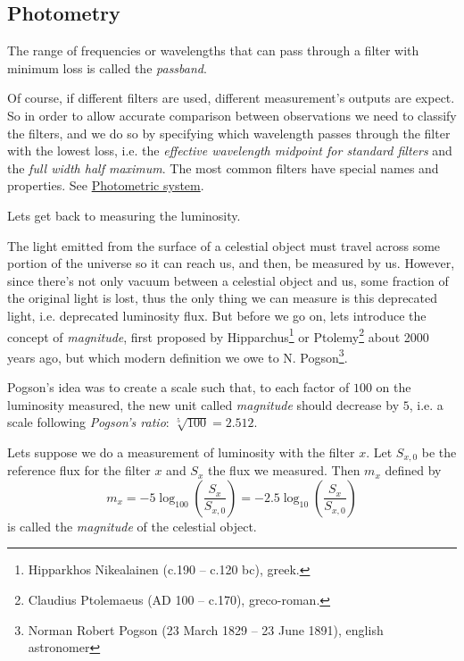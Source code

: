 \documentclass{_mypackages/monograph}
\begin{document}
\subsection{Photometry}

\begin{definition}
The range of frequencies or wavelengths that can pass through a filter with minimum loss is called the \emph{passband}. 
\end{definition}

Of course, if different filters are used, different measurement's outputs are expect. So in order to allow accurate comparison between observations we need to classify the filters, and we do so by specifying which wavelength passes through the filter with the lowest loss, i.e. the \emph{effective wavelength midpoint for standard filters} and the \emph{full width half maximum}. The most common filters have special names and properties. See \href{https://en.wikipedia.org/wiki/Photometric_system#Filters_used}{Photometric system}.

Lets get back to measuring the luminosity.

The light emitted from the surface of a celestial object must travel across some portion of the universe so it can reach us, and then, be measured by us. However, since there's not only vacuum between a celestial object and us, some fraction of the original light is lost, thus the only thing we can measure is this deprecated light, i.e. deprecated luminosity flux. But before we go on, lets introduce the concept of \emph{magnitude}, first proposed by Hipparchus\footnote{Hipparkhos Nikealainen (c.190 – c.120 bc), greek.} or Ptolemy\footnote{Claudius Ptolemaeus (AD 100 – c.170), greco-roman.} about 2000 years ago, but which modern definition we owe to N. Pogson\footnote{Norman Robert Pogson (23 March 1829 – 23 June 1891), english astronomer}. 

Pogson's idea was to create a scale such that, to each factor of \(100\) on the luminosity measured, the new unit called \emph{magnitude} should decrease by \(5\), i.e. a scale following \emph{Pogson's ratio}: \(\sqrt[5]{100} = 2.512\).

\begin{definition}[Magnitude]
Lets suppose we do a measurement of luminosity with the filter \(x\). Let \(S_{x,0}\) be the reference flux for the filter \(x\) and \(S_x\) the flux we measured. Then \(m_x\) defined by
\begin{equation}
    m_x = - 5 \log_{100}\left(\frac{S_x}{S_{x,0}} \right) = - 2.5 \log_{10}\left(\frac{S_x}{S_{x,0}} \right)
\end{equation}
is called the \emph{magnitude} of the celestial object.
\end{definition}
\end{document}
